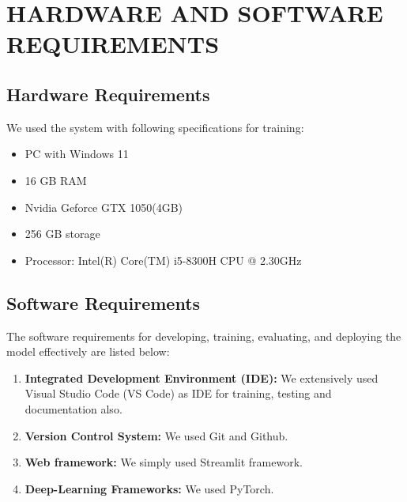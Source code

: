 \newpage
\section{HARDWARE AND SOFTWARE REQUIREMENTS}
\subsection{Hardware Requirements}
We used the system with following specifications for training:
\begin{itemize}
    \item PC with Windows 11
    \item 16 GB RAM 
    \item Nvidia Geforce GTX 1050(4GB)
    \item 256 GB storage
    \item Processor: Intel(R) Core(TM) i5-8300H CPU @ 2.30GHz
\end{itemize}
\subsection{Software Requirements}
The software requirements for developing, training, evaluating, and deploying the
model effectively are listed below: 
\begin{enumerate}
    \item {\bf Integrated Development Environment (IDE):} We extensively used Visual Studio Code (VS Code) as IDE for training, testing and documentation also.
    \item {\bf Version Control System:} We used Git and Github.
    \item {\bf Web framework:} We simply used Streamlit framework.
    \item {\bf Deep-Learning Frameworks:} We used PyTorch.
\end{enumerate}